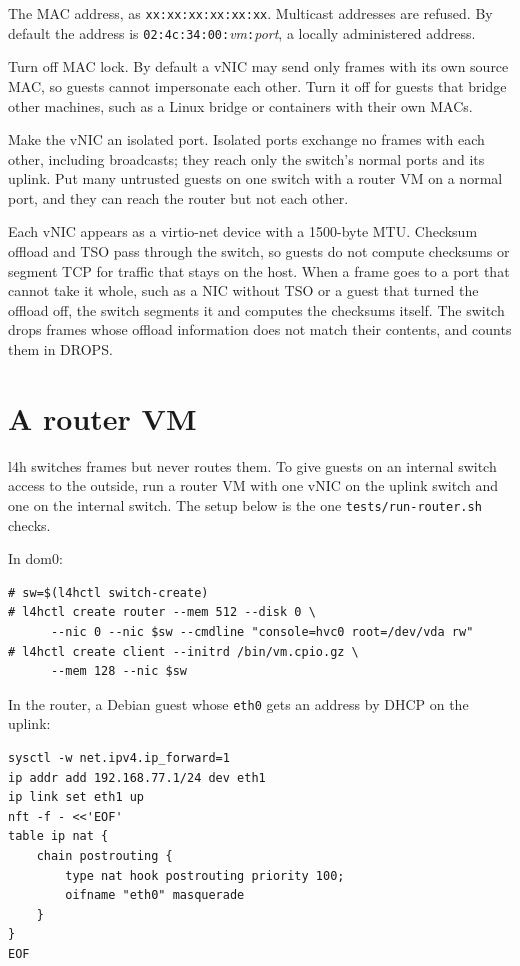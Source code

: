 \documentclass[11pt,a4paper]{report}
\newcommand{\cmd}[1]{\texttt{#1}}
\begin{document}
\begin{description}[style=nextline]
  \item[\texttt{mac=MAC}] The MAC address, as
    \texttt{xx:xx:xx:xx:xx:xx}. Multicast addresses are refused. By default
    the address is \texttt{02:4c:34:00:}\textit{vm}\texttt{:}\textit{port},
    a locally administered address.
  \item[\texttt{nolock}] Turn off MAC lock. By default a vNIC may send only
    frames with its own source MAC, so guests cannot impersonate each other.
    Turn it off for guests that bridge other machines, such as a Linux
    bridge or containers with their own MACs.
  \item[\texttt{isolated}] Make the vNIC an isolated port. Isolated ports
    exchange no frames with each other, including broadcasts; they reach
    only the switch's normal ports and its uplink. Put many untrusted
    guests on one switch with a router VM on a normal port, and they can
    reach the router but not each other.
\end{description}

Each vNIC appears as a virtio-net device with a 1500-byte MTU. Checksum
offload and TSO pass through the switch, so guests do not compute checksums
or segment TCP for traffic that stays on the host. When a frame goes to a
port that cannot take it whole, such as a NIC without TSO or a guest that
turned the offload off, the switch segments it and computes the checksums
itself. The switch drops frames whose offload information does not match
their contents, and counts them in DROPS.

\section{A router VM}
\label{sec:router}

l4h switches frames but never routes them. To give guests on an internal
switch access to the outside, run a router VM with one vNIC on the uplink
switch and one on the internal switch. The setup below is the one
\cmd{tests/run-router.sh} checks.

In dom0:
\begin{lstlisting}
# sw=$(l4hctl switch-create)
# l4hctl create router --mem 512 --disk 0 \
      --nic 0 --nic $sw --cmdline "console=hvc0 root=/dev/vda rw"
# l4hctl create client --initrd /bin/vm.cpio.gz \
      --mem 128 --nic $sw
\end{lstlisting}

In the router, a Debian guest whose \texttt{eth0} gets an address by DHCP on
the uplink:
\begin{lstlisting}
sysctl -w net.ipv4.ip_forward=1
ip addr add 192.168.77.1/24 dev eth1
ip link set eth1 up
nft -f - <<'EOF'
table ip nat {
    chain postrouting {
        type nat hook postrouting priority 100;
        oifname "eth0" masquerade
    }
}
EOF
\end{lstlisting}
\end{document}
